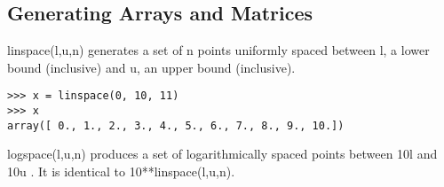 \subsection{Generating Arrays and Matrices}
linspace(l,u,n) generates a set of n points uniformly spaced between l, a lower bound (inclusive) and u,
an upper bound (inclusive).
\begin{framed}
\begin{verbatim}
>>> x = linspace(0, 10, 11)
>>> x
array([ 0., 1., 2., 3., 4., 5., 6., 7., 8., 9., 10.])
\end{verbatim}
\end{framed}
logspace(l,u,n) produces a set of logarithmically spaced points between 10l and 10u . It is identical to
10**linspace(l,u,n).
